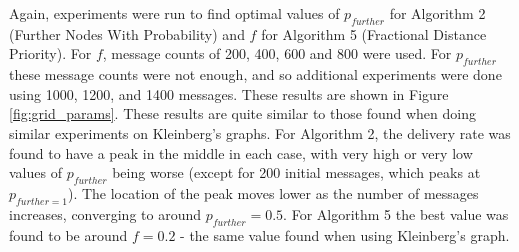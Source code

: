 \documentclass[bsc,frontabs,twoside,singlespacing,parskip,deptreport]{infthesis}     %
\begin{document}
Again, experiments were run to find optimal values of $p_{further}$ for Algorithm 2 (Further Nodes With Probability) and $f$ for Algorithm 5 (Fractional Distance Priority). For $f$, message counts of 200, 400, 600 and 800 were used. For $p_{further}$ these message counts were not enough, and so additional experiments were done using 1000, 1200, and 1400 messages. These results are shown in Figure \ref{fig:grid_params}. These results are quite similar to those found when doing similar experiments on Kleinberg's graphs. For Algorithm 2, the delivery rate was found to have a peak in the middle in each case, with very high or very low values of $p_{further}$ being worse (except for 200 initial messages, which peaks at $p_{further=1}$). The location of the peak moves lower as the number of messages increases, converging to around $p_{further}=0.5$. For Algorithm 5 the best value was found to be around $f=0.2$ - the same value found when using Kleinberg's graph.
\end{document}
